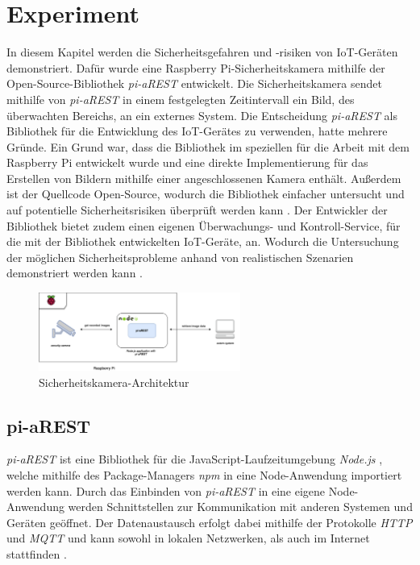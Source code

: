 \section{Experiment}
In diesem Kapitel werden die Sicherheitsgefahren und -risiken von IoT-Geräten
demonstriert.  Dafür wurde eine Raspberry Pi-Sicherheitskamera mithilfe der
Open-Source-Bibliothek \textit{pi-aREST} \cite{piarestgtihub, piarestnpm}
entwickelt. Die Sicherheitskamera sendet mithilfe von \textit{pi-aREST} in
einem festgelegten Zeitintervall ein Bild, des überwachten Bereichs, an ein
externes System. Die Entscheidung \textit{pi-aREST} als Bibliothek für die
Entwicklung des IoT-Gerätes zu verwenden, hatte mehrere Gründe.  Ein Grund war,
dass die Bibliothek im speziellen für die Arbeit mit dem Raspberry Pi
entwickelt wurde und eine direkte Implementierung für das Erstellen von Bildern
mithilfe einer angeschlossenen Kamera enthält. Außerdem ist der Quellcode
Open-Source, wodurch die Bibliothek einfacher untersucht und auf potentielle
Sicherheitsrisiken überprüft werden kann \cite{piarestgtihub}. Der Entwickler
der Bibliothek bietet zudem einen eigenen Überwachungs- und Kontroll-Service,
für die mit der Bibliothek entwickelten IoT-Geräte, an. Wodurch die
Untersuchung der möglichen Sicherheitsprobleme anhand von realistischen
Szenarien demonstriert werden kann \cite{arestservice}.

\begin{figure}[t]
  \centerline{\includegraphics[width=250px]{images/raspberry_architecture}}
  \caption{Sicherheitskamera-Architektur}
  \label{fig:arch-raspberrypi}
\end{figure}

\subsection{pi-aREST}
\textit{pi-aREST} ist eine Bibliothek für die JavaScript-Laufzeitumgebung
\textit{Node.js} \cite{node}, welche mithilfe des Package-Managers \textit{npm}
\cite{piarestnpm} in eine Node-Anwendung importiert werden kann. Durch das
Einbinden von \textit{pi-aREST} in eine eigene Node-Anwendung werden
Schnittstellen zur Kommunikation mit anderen Systemen und Geräten geöffnet. Der
Datenaustausch erfolgt dabei mithilfe der Protokolle \textit{HTTP} und
\textit{MQTT} und kann sowohl in lokalen Netzwerken, als auch im Internet
stattfinden \cite{piarestgtihub}.

